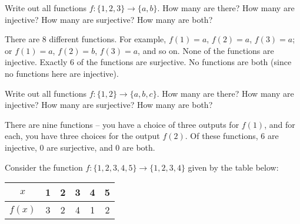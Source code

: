 \begin{questions}


\question Write out all functions $f: \{1,2,3\} \to \{a,b\}$.  How many are there?  How many are injective?  How many are surjective?  How many are both?

	\begin{answer}
	There are 8 different functions.  For example, $f(1) = a$, $f(2) = a$, $f(3) = a$; or $f(1) = a$, $f(2) = b$, $f(3) = a$, and so on.  None of the functions are injective.  Exactly 6 of the functions are surjective.  No functions are both (since no functions here are injective).
	\end{answer}




\question Write out all functions $f: \{1,2\} \to \{a,b,c\}$.  How many are there?  How many are injective?  How many are surjective?  How many are both?

	\begin{answer}
	There are nine functions -- you have a choice of three outputs for $f(1)$, and for each, you have three choices for the output $f(2)$.  Of these functions, 6 are injective, 0 are surjective, and 0 are both.
	\end{answer}




\question Consider the function $f:\{1,2,3,4,5\} \to \{1,2,3,4\}$ given by the table below:

\begin{center}
\begin{tabular}{c||c|c|c|c|c}
              $x$ & 1 & 2 & 3 & 4 & 5 \\ \hline
              $f(x)$ & 3 & 2 & 4 & 1 & 2
            \end{tabular}
\end{center}


	\begin{answer}
\end{answer}
\end{questions}
